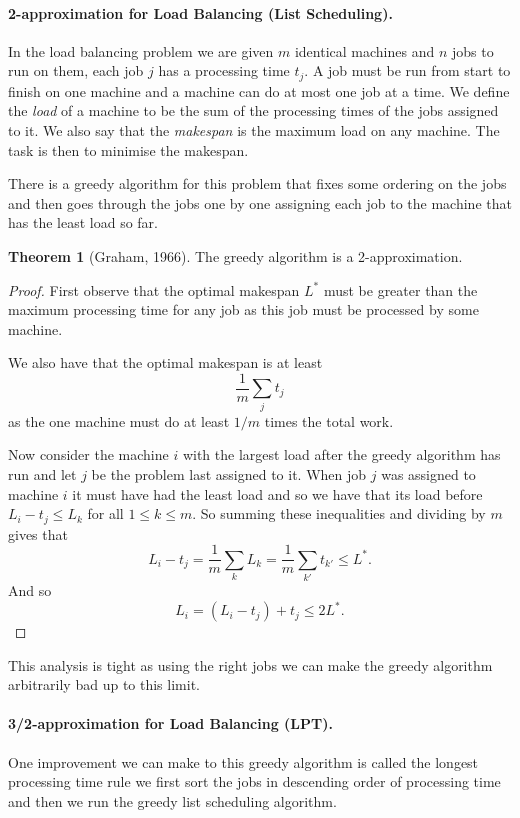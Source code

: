 \documentclass[11pt,a4paper]{article}
\theoremstyle{definition}
\newtheorem{thm}{Theorem}
\begin{document}
\paragraph{2-approximation for Load Balancing (List Scheduling).}
In the load balancing problem we are given $m$ identical machines and $n$ jobs to run on them, each job $j$ has a processing time $t_j$.
A job must be run from start to finish on one machine and a machine can do at most one job at a time.
We define the \emph{load} of a machine to be the sum of the processing times of the jobs assigned to it.
We also say that the \emph{makespan} is the maximum load on any machine.
The task is then to minimise the makespan.

There is a greedy algorithm for this problem that fixes some ordering on the jobs and then goes through the jobs one by one assigning each job to the machine that has the least load so far.

\begin{thm}[Graham, 1966]
The greedy algorithm is a 2-approximation.
\end{thm}
\begin{proof}
First observe that the optimal makespan $L^*$ must be greater than the maximum processing time for any job as this job must be processed by some machine.

We also have that the optimal makespan is at least
\[
\frac{1}{m}\sum_{j} t_j
\]
as the one machine must do at least $1/m$ times the total work.

Now consider the machine $i$ with the largest load after the greedy algorithm has run and let $j$ be the problem last assigned to it.
When job $j$ was assigned to machine $i$ it must have had the least load and so we have that its load before $L_i - t_j \le L_k$ for all $1 \le k \le m$.
So summing these inequalities and dividing by $m$ gives that
\[
L_i - t_j = \frac{1}{m}\sum_{k} L_k = \frac{1}{m}\sum_{k'} t_{k'} \le L^*.
\]
And so
\[
L_i = (L_i - t_j) + t_j \le 2L^*.
\]
\end{proof}

This analysis is tight as using the right jobs we can make the greedy algorithm arbitrarily bad up to this limit.

\paragraph{3/2-approximation for Load Balancing (LPT).}
One improvement we can make to this greedy algorithm is called the longest processing time rule we first sort the jobs in descending order of processing time and then we run the greedy list scheduling algorithm.
\end{document}
